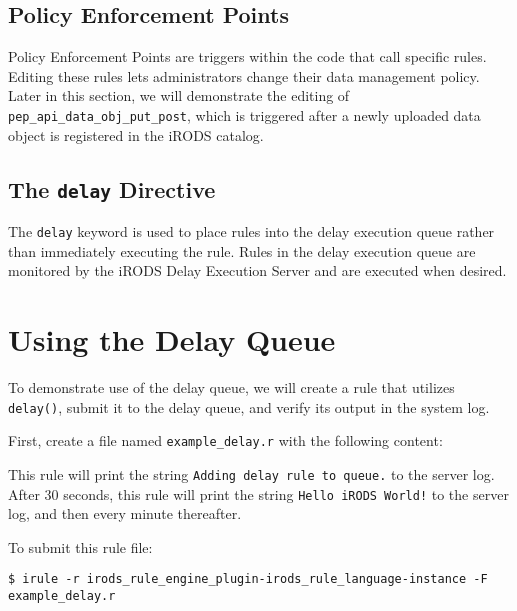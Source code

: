 \documentclass[10pt,oneside]{memoir}
\begin{document}
\subsection{Policy Enforcement Points}

Policy Enforcement Points are triggers within the code that call specific rules. Editing these rules lets administrators change their data management policy. Later in this section, we will demonstrate the editing of \texttt{pep\_api\_data\_obj\_put\_post}, which is triggered after a newly uploaded data object is registered in the iRODS catalog.

\subsection{The \texttt{delay} Directive}

The \texttt{delay} keyword is used to place rules into the delay execution queue rather than immediately executing the rule. Rules in the delay execution queue are monitored by the iRODS Delay Execution Server and are executed when desired.

\section{Using the Delay Queue}

To demonstrate use of the delay queue, we will create a rule that utilizes \texttt{delay()}, submit it to the delay queue, and verify its output in the system log.

First, create a file named \texttt{example\_delay.r} with the following content:

\begin{lrbox}{\exampleDelayRule}

\end{lrbox}
\href{https://raw.githubusercontent.com/irods/irods_training/ugm2024/beginner/example_delay.r}{\usebox{\exampleDelayRule}}

This rule will print the string \texttt{Adding delay rule to queue.} to the server log. After 30 seconds, this rule will print the string \texttt{Hello iRODS World!} to the server log, and then every minute thereafter.

To submit this rule file:

\begin{lstlisting}
$ irule -r irods_rule_engine_plugin-irods_rule_language-instance -F example_delay.r
\end{lstlisting}
\end{document}
